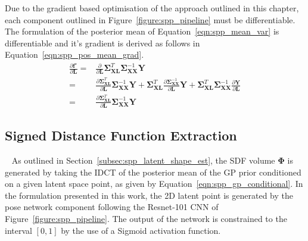 Due to the gradient based optimisation of the approach outlined in this chapter, each 
component outlined in Figure~\ref{figure:spp_pipeline} must be differentiable. The formulation 
of the posterior mean of Equation~\ref{eqn:spp_mean_var} is differentiable and it's gradient 
is derived as follows in Equation~\ref{eqn:spp_pos_mean_grad}.
\begin{align}
  \label{eqn:spp_pos_mean_grad}
  \frac{\partial \bm{f}^{\star}}{\partial \bm{L}} ={}&
  \frac{\partial}{\partial \bm{L}}
  \bm{\Sigma}_{\bm{XL}}^{T} \bm{\Sigma}_{\bm{XX}}^{-1} \bm{Y}\\
  ={}& \frac{\partial \bm{\Sigma}_{\bm{XL}}^{T}}{\partial \bm{L}}
  \bm{\Sigma}_{\bm{XX}}^{-1} \bm{Y}
  + \bm{\Sigma}_{\bm{XL}}^{T} 
  \frac{\partial\bm{\Sigma}_{\bm{XX}}^{-1}}{\partial \bm{L}} \bm{Y}
  + \bm{\Sigma}_{\bm{XL}}^{T} \bm{\Sigma}_{\bm{XX}}^{-1} 
  \frac{\partial \bm{Y}}{\partial \bm{L}}\\
  ={}& \frac{\partial \bm{\Sigma}_{\bm{XL}}^{T}}{\partial \bm{L}}
  \bm{\Sigma}_{\bm{XX}}^{-1} \bm{Y}
\end{align}

\subsection{Signed Distance Function Extraction}
~\label{subsec:sdf_extraction}
As outlined in Section~\ref{subsec:spp_latent_shape_est}, the SDF volume \( \bm{\Phi} \) 
is generated by taking the IDCT of the posterior mean of the GP prior conditioned on 
a given latent space point, as given by Equation~\ref{eqn:spp_gp_conditional}. In the 
formulation presented in this work, the 2D latent point is generated by the pose 
network component following the Resnet-101 CNN of Figure~\ref{figure:spp_pipeline}. 
The output of the network is constrained to the interval \( [0, 1] \) by the use of a Sigmoid 
activation function.%

